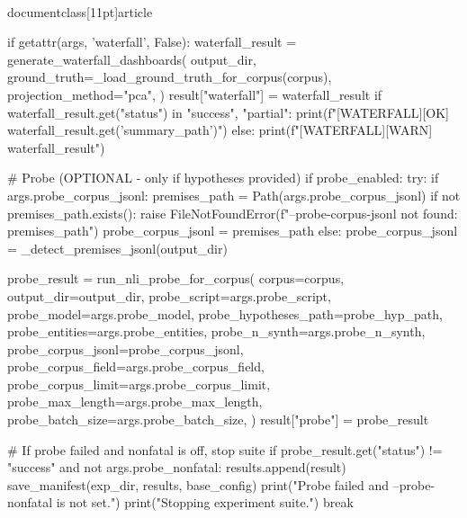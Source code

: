 \\documentclass[11pt]{article}
\begin{document}
\begin{CodeBlock}
                if getattr(args, 'waterfall', False):
                    waterfall_result = generate_waterfall_dashboards(
                        output_dir,
                        ground_truth=_load_ground_truth_for_corpus(corpus),
                        projection_method="pca",
                    )
                    result["waterfall"] = waterfall_result
                    if waterfall_result.get("status") in {"success", "partial"}:
                        print(f"[WATERFALL][OK] {waterfall_result.get('summary_path')}")
                    else:
                        print(f"[WATERFALL][WARN] {waterfall_result}")
        
                # Probe (OPTIONAL - only if hypotheses provided)
                if probe_enabled:
                    try:
                        if args.probe_corpus_jsonl:
                            premises_path = Path(args.probe_corpus_jsonl)
                            if not premises_path.exists():
                                raise FileNotFoundError(f"--probe-corpus-jsonl not found: {premises_path}")
                            probe_corpus_jsonl = premises_path
                        else:
                            probe_corpus_jsonl = _detect_premises_jsonl(output_dir)
        
                        probe_result = run_nli_probe_for_corpus(
                            corpus=corpus,
                            output_dir=output_dir,
                            probe_script=args.probe_script,
                            probe_model=args.probe_model,
                            probe_hypotheses_path=probe_hyp_path,
                            probe_entities=args.probe_entities,
                            probe_n_synth=args.probe_n_synth,
                            probe_corpus_jsonl=probe_corpus_jsonl,
                            probe_corpus_field=args.probe_corpus_field,
                            probe_corpus_limit=args.probe_corpus_limit,
                            probe_max_length=args.probe_max_length,
                            probe_batch_size=args.probe_batch_size,
                        )
                        result["probe"] = probe_result
        
                        # If probe failed and nonfatal is off, stop suite
                        if probe_result.get("status") != "success" and not args.probe_nonfatal:
                            results.append(result)
                            save_manifest(exp_dir, results, base_config)
                            print("\n Probe failed and --probe-nonfatal is not set.")
                            print("Stopping experiment suite.")
                            break
        

\end{CodeBlock}
\end{document}
